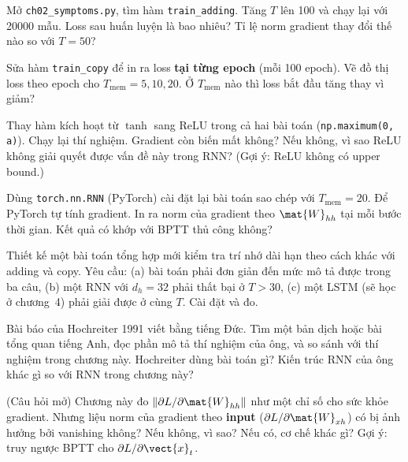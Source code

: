 \begin{bt}
  \item Mở \texttt{ch02_symptoms.py}, tìm hàm
    \texttt{train_adding}. Tăng $T$ lên 100 và chạy lại với
    20000 mẫu. Loss sau huấn luyện là bao nhiêu? Tỉ lệ norm gradient thay
    đổi thế nào so với $T=50$?

  \item Sửa hàm \texttt{train_copy} để in ra loss \textbf{tại
    từng epoch} (mỗi 100 epoch). Vẽ đồ thị loss theo epoch cho $T_{\text{mem}}
    = 5, 10, 20$. Ở $T_{\text{mem}}$ nào thì loss bắt đầu tăng thay vì giảm?

  \item Thay hàm kích hoạt từ $\tanh$ sang ReLU trong cả hai bài toán
    (\texttt{np.maximum(0, a)}). Chạy lại thí nghiệm. Gradient
    còn biến mất không? Nếu không, vì sao ReLU không giải quyết được vấn
    đề này trong RNN? (Gợi ý: ReLU không có upper bound.)

  \item Dùng \texttt{torch.nn.RNN} (PyTorch) cài đặt lại bài
    toán sao chép với $T_{\text{mem}} = 20$. Để PyTorch tự tính gradient.
    In ra norm của gradient theo $\mat{W}_{hh}$ tại mỗi bước thời gian.
    Kết quả có khớp với BPTT thủ công không?
\end{bt}

%

\tierextend

%

\begin{bt}
  \item Thiết kế một bài toán tổng hợp mới kiểm tra trí nhớ dài hạn theo
    cách khác với adding và copy. Yêu cầu: (a) bài toán phải đơn giản đến
    mức mô tả được trong ba câu, (b) một RNN với $d_h = 32$ phải thất bại
    ở $T > 30$, (c) một LSTM (sẽ học ở chương~4) phải giải được ở cùng $T$.
    Cài đặt và đo.

  \item Bài báo của Hochreiter 1991 viết bằng tiếng Đức. Tìm một bản dịch
    hoặc bài tổng quan tiếng Anh, đọc phần mô tả thí nghiệm của ông, và
    so sánh với thí nghiệm trong chương này. Hochreiter dùng bài toán gì?
    Kiến trúc RNN của ông khác gì so với RNN trong chương này?

  \item (Câu hỏi mở) Chương này đo $\|\partial L / \partial \mat{W}_{hh}\|$
    như một chỉ số cho sức khỏe gradient. Nhưng liệu norm của gradient theo
    \textbf{input} ($\partial L / \partial \mat{W}_{xh}$) có bị ảnh hưởng
    bởi vanishing không? Nếu không, vì sao? Nếu có, cơ chế khác gì? Gợi ý:
    truy ngược BPTT cho $\partial L / \partial \vect{x}_t$.
\end{bt}

%
